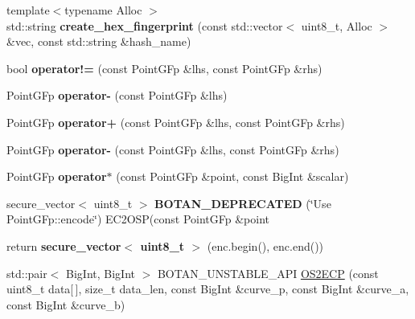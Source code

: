 \begin{DoxyCompactItemize}
\item 
\mbox{\label{namespace_botan_a2c2ef503f22a2ecf449c39d1a42b6fea}} 
{\footnotesize template$<$typename Alloc $>$ }\\std\+::string {\bfseries create\+\_\+hex\+\_\+fingerprint} (const std\+::vector$<$ uint8\+\_\+t, Alloc $>$ \&vec, const std\+::string \&hash\+\_\+name)
\item 
\mbox{\label{namespace_botan_ac92cb68537b7bb61311f7b214c6a01ca}} 
bool {\bfseries operator!=} (const Point\+G\+Fp \&lhs, const Point\+G\+Fp \&rhs)
\item 
\mbox{\label{namespace_botan_a3ec2a919f0d3e9a53b081f3647ef0831}} 
Point\+G\+Fp {\bfseries operator-\/} (const Point\+G\+Fp \&lhs)
\item 
\mbox{\label{namespace_botan_ac3cb3ef72a835fa7742d7514a4aedab1}} 
Point\+G\+Fp {\bfseries operator+} (const Point\+G\+Fp \&lhs, const Point\+G\+Fp \&rhs)
\item 
\mbox{\label{namespace_botan_aa7e066f87e0618c623684de6276d71fe}} 
Point\+G\+Fp {\bfseries operator-\/} (const Point\+G\+Fp \&lhs, const Point\+G\+Fp \&rhs)
\item 
\mbox{\label{namespace_botan_ad833dc0e005704e4e640e7090b1d2753}} 
Point\+G\+Fp {\bfseries operator$\ast$} (const Point\+G\+Fp \&point, const Big\+Int \&scalar)
\item 
\mbox{\label{namespace_botan_aed298213506b23172a7cc53b1a84327f}} 
secure\+\_\+vector$<$ uint8\+\_\+t $>$ {\bfseries B\+O\+T\+A\+N\+\_\+\+D\+E\+P\+R\+E\+C\+A\+T\+ED} (\char`\"{}Use Point\+G\+Fp\+::encode\char`\"{}) E\+C2\+O\+SP(const Point\+G\+Fp \&point
\item 
\mbox{\label{namespace_botan_a2f7dfc89a9ffff38439f28d6d2e26121}} 
return {\bfseries secure\+\_\+vector$<$ uint8\+\_\+t $>$} (enc.\+begin(), enc.\+end())
\item 
std\+::pair$<$ Big\+Int, Big\+Int $>$ B\+O\+T\+A\+N\+\_\+\+U\+N\+S\+T\+A\+B\+L\+E\+\_\+\+A\+PI \hyperlink{namespace_botan_a1176657848d01fc06ba2d1e2faf0669d}{O\+S2\+E\+CP} (const uint8\+\_\+t data\mbox{[}$\,$\mbox{]}, size\+\_\+t data\+\_\+len, const Big\+Int \&curve\+\_\+p, const Big\+Int \&curve\+\_\+a, const Big\+Int \&curve\+\_\+b)

\end{DoxyCompactItemize}
